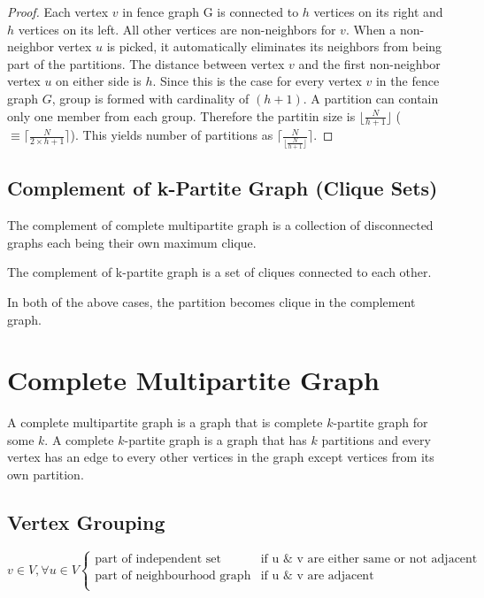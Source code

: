 \documentclass[12pt]{article}
\theoremstyle{plain}
\theoremstyle{definition}
\newcommand{\floor}[1]{\lfloor #1 \rfloor}
\newcommand{\ceil}[1]{\lceil #1 \rceil}
\begin{document}
\begin{proof}
	Each vertex $v$ in fence graph G is connected to $h$ vertices on its right and $h$ vertices on its left. All other vertices are non-neighbors for $v$. When a non-neighbor vertex $u$ is picked, it automatically eliminates its neighbors from being part of the partitions. The distance between vertex $v$ and the first non-neighbor vertex $u$ on either side is $h$. Since this is the case for every vertex $v$ in the fence graph $G$, group is formed with cardinality of $(h + 1)$. A partition can contain only one member from each group. Therefore the partitin size is $\floor{\frac{N}{h + 1}}$ ($\equiv \ceil{\frac{N}{2 \times h + 1}}$). This yields number of partitions as $\ceil{\frac{N}{\floor{\frac{N}{h + 1}}}}$.
\end{proof}

\subsection{Complement of k-Partite Graph (Clique Sets)} \label{CliqueSet}
The complement of complete multipartite graph is a collection of disconnected graphs each being their own maximum clique.

The complement of k-partite graph is a set of cliques connected to each other.

In both of the above cases, the partition becomes clique in the complement graph.

\section{Complete Multipartite Graph}

A complete multipartite graph is a graph that is complete $k$-partite graph for some $k$. A complete $k$-partite graph is a graph that has $k$ partitions and every vertex has an edge to every other vertices in the graph except vertices from its own partition.

\subsection{Vertex Grouping} \label{CMGVertexGroup}

\begin{equation}
v \in V, \forall u \in V
\left\{ 
\begin{array}{ll}
\mbox{part of independent set} & \mbox{if u $\&$ v are either same or not adjacent} \\
\mbox{part of neighbourhood graph} & \mbox{if u $\&$ v are adjacent} \\
\end{array} \right.
\end{equation}
\end{document}
